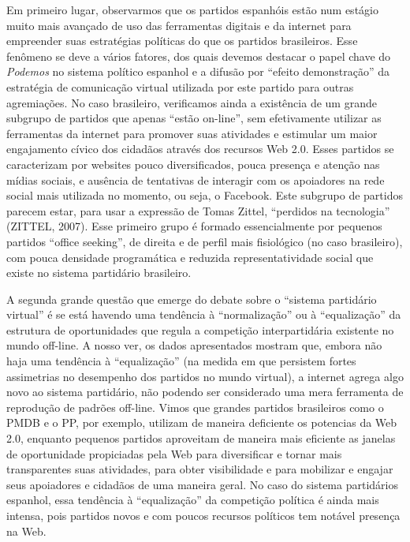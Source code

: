 Em primeiro lugar, observarmos que os partidos espanhóis estão num
estágio muito mais avançado de uso das ferramentas digitais e da
internet para empreender suas estratégias políticas do que os partidos
brasileiros. Esse fenômeno se deve a vários fatores, dos quais devemos
destacar o papel chave do \emph{Podemos} no sistema político espanhol e
a difusão por ``efeito demonstração'' da estratégia de comunicação
virtual utilizada por este partido para outras agremiações. No caso
brasileiro, verificamos ainda a existência de um grande subgrupo de
partidos que apenas ``estão on-line'', sem efetivamente utilizar as
ferramentas da internet para promover suas atividades e estimular um
maior engajamento cívico dos cidadãos através dos recursos Web 2.0.
Esses partidos se caracterizam por websites pouco diversificados, pouca
presença e atenção nas mídias sociais, e ausência de tentativas de
interagir com os apoiadores na rede social mais utilizada no momento, ou
seja, o Facebook. Este subgrupo de partidos parecem estar, para usar a
expressão de Tomas Zittel, ``perdidos na tecnologia'' (ZITTEL, 2007).
Esse primeiro grupo é formado essencialmente por pequenos partidos
``office seeking'', de direita e de perfil mais fisiológico (no caso
brasileiro), com pouca densidade programática e reduzida
representatividade social que existe no sistema partidário brasileiro.

A segunda grande questão que emerge do debate sobre o ``sistema
partidário virtual'' é se está havendo uma tendência à ``normalização''
ou à ``equalização'' da estrutura de oportunidades que regula a
competição interpartidária existente no mundo off-line. A nosso ver, os
dados apresentados mostram que, embora não haja uma tendência à
``equalização'' (na medida em que persistem fortes assimetrias no
desempenho dos partidos no mundo virtual), a internet agrega algo novo
ao sistema partidário, não podendo ser considerado uma mera ferramenta
de reprodução de padrões off-line. Vimos que grandes partidos
brasileiros como o PMDB e o PP, por exemplo, utilizam de maneira
deficiente os potencias da Web 2.0, enquanto pequenos partidos
aproveitam de maneira mais eficiente as janelas de oportunidade
propiciadas pela Web para diversificar e tornar mais transparentes suas
atividades, para obter visibilidade e para mobilizar e engajar seus
apoiadores e cidadãos de uma maneira geral. No caso do sistema
partidários espanhol, essa tendência à ``equalização'' da competição
política é ainda mais intensa, pois partidos novos e com poucos recursos
políticos tem notável presença na Web.

